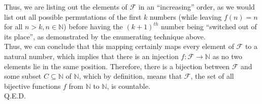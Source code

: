 \documentclass{article}
\begin{document}
Thus, we are listing out the elements of $\mathscr{F}$ in an ``increasing'' order, as we would list out all possible permutations of the first $k$ numbers (while leaving $f(n) = n$ for all $n>k, n\in\mathbb{N}$) before having the $(k+1)^{th}$ number being ``switched out of its place'', as demonstrated by the enumerating technique above. \\

Thus, we can conclude that this mapping certainly maps every element of $\mathscr{F}$ to a natural number, which implies that there is an injection $f:\mathscr{F}\rightarrow\mathbb{N}$ as no two elements lie in the same position.
Therefore, there is a bijection between $\mathscr{F}$ and some subset $C\subseteq\mathbb{N}$ of $\mathbb{N}$, which by definition, means that $\mathscr{F}$, the set of all bijective functions $f$ from $\mathbb{N}$ to $\mathbb{N}$, is countable. \\

Q.E.D.
\end{document}
